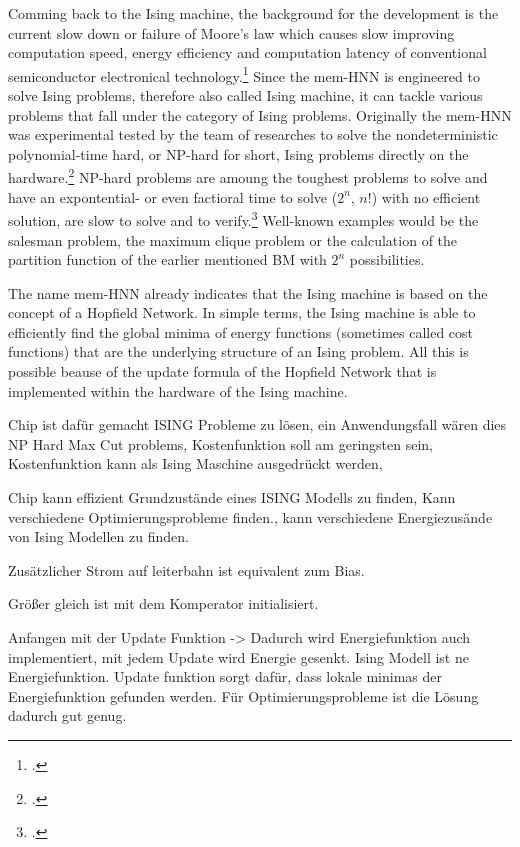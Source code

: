 Comming back to the Ising machine, the background for the development is the current slow down or failure of Moore's law which causes slow improving computation speed, energy efficiency and computation latency of conventional semiconductor electronical technology.\footcite[cf.][1]{caiHarnessingIntrinsicNoise2019}
Since the \ac{mem-HNN} is engineered to solve Ising problems, therefore also called Ising machine, it can tackle various problems that fall under the category of Ising problems. 
Originally the mem-HNN was experimental tested by the team of researches to solve the nondeterministic polynomial-time hard, or NP-hard for short, Ising problems directly on the hardware.\footcite[cf.][410]{caiPowerefficientCombinatorialOptimization2020}
NP-hard problems are amoung the toughest problems to solve and have an expontential- or even factioral time to solve (\( 2^{n} \), \( n{!} \)) with no efficient solution, are slow to solve and to verify.\footcite[cf.][497-500]{izadkhahNPNPCompleteNPHard2022}
Well-known examples would be the salesman problem, the maximum clique problem or the calculation of the partition function of the earlier mentioned \ac{BM} with \( 2^{n} \) possibilities.

The name \ac{mem-HNN} already indicates that the Ising machine is based on the concept of a Hopfield Network.
In simple terms, the Ising machine is able to efficiently find the global minima of energy functions (sometimes called cost functions) that are the underlying structure of an Ising problem. 
All this is possible beause of the update formula of the Hopfield Network that is implemented within the hardware of the Ising machine.



Chip ist dafür gemacht ISING Probleme zu lösen, ein Anwendungsfall wären dies NP Hard Max Cut problems, Kostenfunktion 
soll am geringsten sein, Kostenfunktion kann als Ising Maschine ausgedrückt werden, 

Chip kann effizient Grundzustände eines ISING Modells zu finden, Kann verschiedene Optimierungsprobleme finden.,
kann verschiedene Energiezusände von Ising Modellen zu finden. 


Zusätzlicher Strom auf leiterbahn ist equivalent zum Bias. 

Größer gleich ist mit dem Komperator initialisiert. 

Anfangen mit der Update Funktion -> Dadurch wird Energiefunktion auch implementiert, mit jedem Update wird Energie gesenkt.
Ising Modell ist ne Energiefunktion. Update funktion sorgt dafür, dass lokale minimas der Energiefunktion gefunden werden. 
Für Optimierungsprobleme ist die Lösung dadurch gut genug. 

